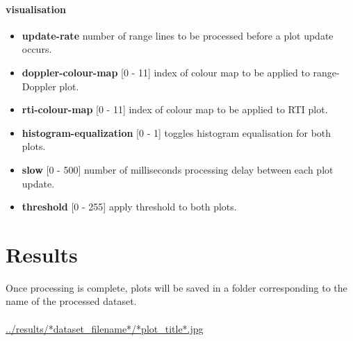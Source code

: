 \documentclass[a4paper,11pt]{report}
\begin{document}
\subsubsection{visualisation}
\begin{itemize}
  \item \textbf{update-rate} number of range lines to be processed before a plot update occurs.
  \item \textbf{doppler-colour-map} [0 - 11] index of colour map to be applied to range-Doppler plot. 
  \item \textbf{rti-colour-map} [0 - 11] index of colour map to be applied to RTI plot. 
  \item \textbf{histogram-equalization} [0 - 1] toggles histogram equalisation for both plots. 
  \item \textbf{slow} [0 - 500] number of milliseconds processing delay between each plot update. 
  \item \textbf{threshold} [0 - 255] apply threshold to both plots. 
\end{itemize}

\chapter{Results}
Once processing is complete, plots will be saved in a folder corresponding to the name of the processed dataset. \\\\
\url{../results/*dataset_filename*/*plot_title*.jpg}
\end{document}
